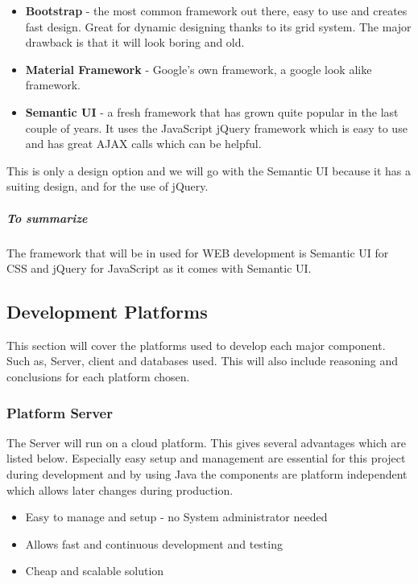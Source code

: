 \documentclass[a4paper,11pt]{article}
\begin{document}
\begin{itemize}
\item
  \textbf{Bootstrap} - the most common framework out there, easy to use
  and creates fast design. Great for dynamic designing thanks to its
  grid system. The major drawback is that it will look boring and old.
\item
  \textbf{Material Framework} - Google's own framework, a google look
  alike framework.
\item
  \textbf{Semantic UI} - a fresh framework that has grown quite popular
  in the last couple of years. It uses the JavaScript jQuery framework
  which is easy to use and has great AJAX calls which can be helpful.
\end{itemize}

\noindent This is only a design option and we will go with the Semantic UI because it has a suiting design, and for the use of jQuery. 

\subparagraph{To summarize}\label{to-summarize}
The framework that will be in used for WEB development is Semantic UI
for CSS and jQuery for JavaScript as it comes with Semantic UI.

\subsection{Development Platforms}
This section will cover the platforms used to develop each major component. Such as, Server, client and databases used. This will also include reasoning and conclusions for each platform chosen.

\subsubsection{Platform Server}
The Server will run on a cloud platform. This gives several advantages which are listed below. Especially easy setup and management are essential for this project during development and by using Java the components are platform independent which allows later changes during production.
\begin{itemize}
\item Easy to manage and setup - no System administrator needed
\item Allows fast and continuous development and testing
\item Cheap and scalable solution
\end{itemize}
\end{document}
